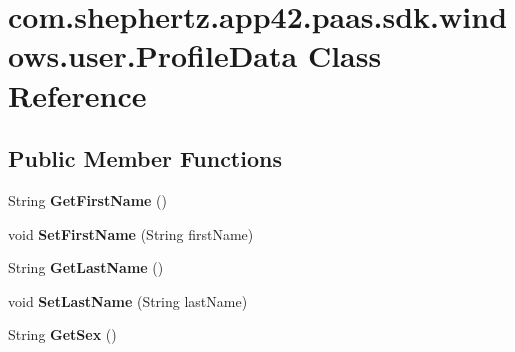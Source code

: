 \hypertarget{classcom_1_1shephertz_1_1app42_1_1paas_1_1sdk_1_1windows_1_1user_1_1_profile_data}{\section{com.\+shephertz.\+app42.\+paas.\+sdk.\+windows.\+user.\+Profile\+Data Class Reference}
\label{classcom_1_1shephertz_1_1app42_1_1paas_1_1sdk_1_1windows_1_1user_1_1_profile_data}
}
\subsection*{Public Member Functions}
\begin{DoxyCompactItemize}
\item 
\hypertarget{classcom_1_1shephertz_1_1app42_1_1paas_1_1sdk_1_1windows_1_1user_1_1_profile_data_a39a654f79ea7bde75b807f7814fb6350}{String {\bfseries Get\+First\+Name} ()}\label{classcom_1_1shephertz_1_1app42_1_1paas_1_1sdk_1_1windows_1_1user_1_1_profile_data_a39a654f79ea7bde75b807f7814fb6350}

\item 
\hypertarget{classcom_1_1shephertz_1_1app42_1_1paas_1_1sdk_1_1windows_1_1user_1_1_profile_data_abfd6b59ef330a38ab97102e25f1c3be1}{void {\bfseries Set\+First\+Name} (String first\+Name)}\label{classcom_1_1shephertz_1_1app42_1_1paas_1_1sdk_1_1windows_1_1user_1_1_profile_data_abfd6b59ef330a38ab97102e25f1c3be1}

\item 
\hypertarget{classcom_1_1shephertz_1_1app42_1_1paas_1_1sdk_1_1windows_1_1user_1_1_profile_data_aebf46c3b8edf68b849f5abc095f39930}{String {\bfseries Get\+Last\+Name} ()}\label{classcom_1_1shephertz_1_1app42_1_1paas_1_1sdk_1_1windows_1_1user_1_1_profile_data_aebf46c3b8edf68b849f5abc095f39930}

\item 
\hypertarget{classcom_1_1shephertz_1_1app42_1_1paas_1_1sdk_1_1windows_1_1user_1_1_profile_data_a34261fa1f7079500fc0bbaccfb00c3d2}{void {\bfseries Set\+Last\+Name} (String last\+Name)}\label{classcom_1_1shephertz_1_1app42_1_1paas_1_1sdk_1_1windows_1_1user_1_1_profile_data_a34261fa1f7079500fc0bbaccfb00c3d2}

\item 
\hypertarget{classcom_1_1shephertz_1_1app42_1_1paas_1_1sdk_1_1windows_1_1user_1_1_profile_data_a35ec15ff67650b6f3c6ccb53277417fb}{String {\bfseries Get\+Sex} ()}\label{classcom_1_1shephertz_1_1app42_1_1paas_1_1sdk_1_1windows_1_1user_1_1_profile_data_a35ec15ff67650b6f3c6ccb53277417fb}


\end{DoxyCompactItemize}
